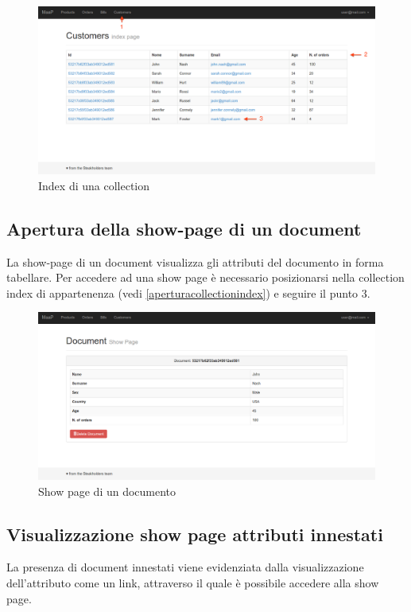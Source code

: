 	\begin{figure}[H]
	\label{fig:collection}
		\centering \includegraphics[width=1\textwidth]{img/collection.png}
	\caption{Index di una collection}
	\end{figure}
	

	\subsection{Apertura della show-page di un document} %
	\label{aperturashowpage}
	La show-page di un document visualizza gli attributi del documento in forma tabellare. Per accedere ad una show page è necessario posizionarsi nella collection index di appartenenza (vedi \ref{aperturacollectionindex}) e seguire il punto 3.

	\begin{figure}[H]
	\label{fig:showpage}
		\centering \includegraphics[width=1\textwidth]{img/showpage.png}
	\caption{Show page di un documento}
	\end{figure}

	\subsection{Visualizzazione show page attributi innestati} %
	La presenza di document innestati viene evidenziata dalla visualizzazione dell'attributo come un link, attraverso il quale è possibile accedere alla show page. 


